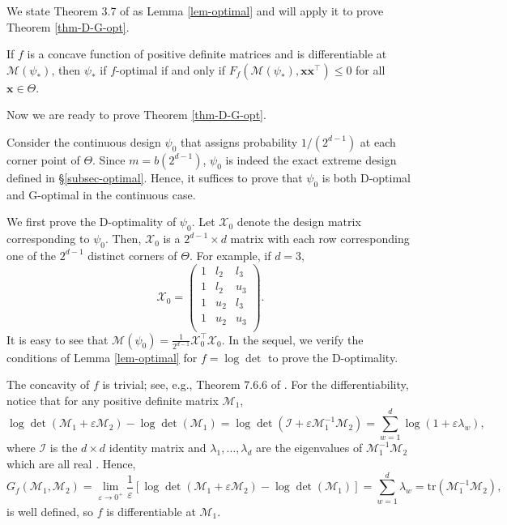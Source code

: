 \documentclass[ijoc,nonblindrev]{informs3}
\def\bx{{\bm x}}
\def\cX{{\mathcal X}}
\def\cI{{\mathcal I}}
\def\cM{{\mathcal M}}
\def\tr{{\text{tr}}}
\begin{document}
We state Theorem 3.7 of \cite{silvey1980optimal_ec} as Lemma \ref{lem-optimal} and will apply it to prove Theorem \ref{thm-D-G-opt}.

\begin{lemma}  \label{lem-optimal}
If $f$ is a concave function of positive definite matrices and is differentiable at $\cM(\psi_*)$, then $\psi_*$ if $f$-optimal if and only if $F_f(\cM(\psi_*),\bx \bx^\intercal)\leq 0$ for all $\bx \in \Theta$.
\end{lemma}

Now we are ready to prove Theorem \ref{thm-D-G-opt}.

Consider the continuous design $\psi_0$ that assigns probability $1/(2^{d-1})$ at each corner point of $\Theta$.
Since $m=b(2^{d-1})$, $\psi_0$ is indeed the exact extreme design defined in \S \ref{subsec-optimal}.
Hence, it suffices to prove that $\psi_0$ is both D-optimal and G-optimal in the continuous case.

We first prove the D-optimality of $\psi_0$. Let $\cX_0$ denote the design matrix corresponding to $\psi_0$. Then, $\cX_0$ is a $2^{d-1} \times d$ matrix with each row corresponding one of the $2^{d-1}$ distinct corners of $\Theta$. For example, if $d=3$,
$$
\cX_0 =
\left(
  \begin{array}{ccc}
    1 & l_2 & l_3 \\
    1 & l_2 & u_3 \\
    1 & u_2 & l_3 \\
    1 & u_2 & u_3 \\
  \end{array}
\right).
$$
It is easy to see that $\cM(\psi_0) = \frac{1}{2^{d-1}} \cX_0^\intercal \cX_0$. In the sequel, we verify the conditions of Lemma \ref{lem-optimal} for $f = \log \det $ to prove the D-optimality.

The concavity of $f$ is trivial; see, e.g., Theorem 7.6.6 of \cite{horn1990matrix_ec}. For the differentiability, notice that for any positive definite matrix $\cM_1$,
$$
\log \det(\cM_1 + \varepsilon \cM_2) - \log \det(\cM_1) = \log \det (\cI + \varepsilon \cM_1^{-1} \cM_2) = \sum_{w=1}^d \log (1+\varepsilon \lambda_w),
$$
where $\cI$ is the $d \times d$ identity matrix and $\lambda_1, \ldots, \lambda_d$ are the eigenvalues of $\cM_1^{-1} \cM_2$ which are all real \cite[Corollary 7.6.2]{horn1990matrix_ec}. Hence,
\[
G_f(\cM_1,\cM_2) = \lim_{\varepsilon \to  0^+} \frac{1}{\varepsilon} \left[  \log \det(\cM_1 + \varepsilon \cM_2) - \log \det(\cM_1) \right]
= \sum_{w=1}^d \lambda_w
= \tr(\cM_1^{-1} \cM_2),
\]
is well defined, so $f$ is differentiable at $\cM_1$.
\end{document}
